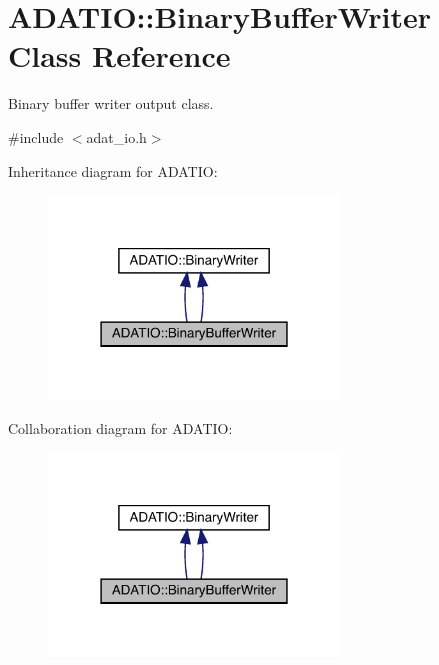 \hypertarget{classADATIO_1_1BinaryBufferWriter}{}\section{A\+D\+A\+T\+IO\+:\+:Binary\+Buffer\+Writer Class Reference}
\label{classADATIO_1_1BinaryBufferWriter}


Binary buffer writer output class.  




{\ttfamily \#include $<$adat\+\_\+io.\+h$>$}



Inheritance diagram for A\+D\+A\+T\+IO\+:\nopagebreak
\begin{figure}[H]
\begin{center}
\leavevmode
\includegraphics[width=219pt]{d3/d69/classADATIO_1_1BinaryBufferWriter__inherit__graph}
\end{center}
\end{figure}


Collaboration diagram for A\+D\+A\+T\+IO\+:\nopagebreak
\begin{figure}[H]
\begin{center}
\leavevmode
\includegraphics[width=219pt]{d5/dc5/classADATIO_1_1BinaryBufferWriter__coll__graph}
\end{center}
\end{figure}
